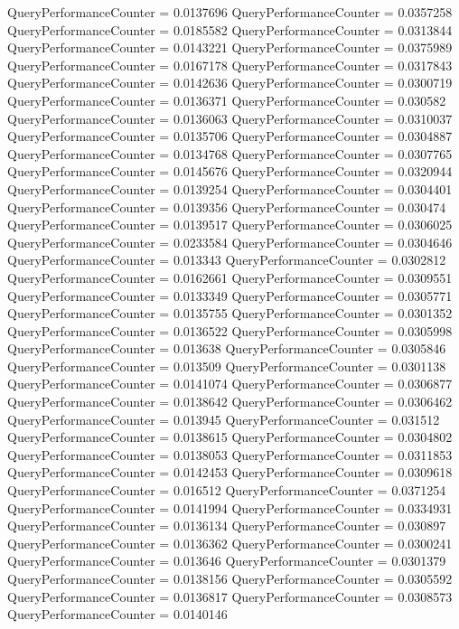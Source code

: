 \documentclass[9pt]{article}
\theoremstyle{plain}
\theoremstyle{definition}
\theoremstyle{remark}
\numberwithin{equation}{section}
\begin{document}
QueryPerformanceCounter  =  0.0137696
QueryPerformanceCounter  =  0.0357258
QueryPerformanceCounter  =  0.0185582
QueryPerformanceCounter  =  0.0313844
QueryPerformanceCounter  =  0.0143221
QueryPerformanceCounter  =  0.0375989
QueryPerformanceCounter  =  0.0167178
QueryPerformanceCounter  =  0.0317843
QueryPerformanceCounter  =  0.0142636
QueryPerformanceCounter  =  0.0300719
QueryPerformanceCounter  =  0.0136371
QueryPerformanceCounter  =  0.030582
QueryPerformanceCounter  =  0.0136063
QueryPerformanceCounter  =  0.0310037
QueryPerformanceCounter  =  0.0135706
QueryPerformanceCounter  =  0.0304887
QueryPerformanceCounter  =  0.0134768
QueryPerformanceCounter  =  0.0307765
QueryPerformanceCounter  =  0.0145676
QueryPerformanceCounter  =  0.0320944
QueryPerformanceCounter  =  0.0139254
QueryPerformanceCounter  =  0.0304401
QueryPerformanceCounter  =  0.0139356
QueryPerformanceCounter  =  0.030474
QueryPerformanceCounter  =  0.0139517
QueryPerformanceCounter  =  0.0306025
QueryPerformanceCounter  =  0.0233584
QueryPerformanceCounter  =  0.0304646
QueryPerformanceCounter  =  0.013343
QueryPerformanceCounter  =  0.0302812
QueryPerformanceCounter  =  0.0162661
QueryPerformanceCounter  =  0.0309551
QueryPerformanceCounter  =  0.0133349
QueryPerformanceCounter  =  0.0305771
QueryPerformanceCounter  =  0.0135755
QueryPerformanceCounter  =  0.0301352
QueryPerformanceCounter  =  0.0136522
QueryPerformanceCounter  =  0.0305998
QueryPerformanceCounter  =  0.013638
QueryPerformanceCounter  =  0.0305846
QueryPerformanceCounter  =  0.013509
QueryPerformanceCounter  =  0.0301138
QueryPerformanceCounter  =  0.0141074
QueryPerformanceCounter  =  0.0306877
QueryPerformanceCounter  =  0.0138642
QueryPerformanceCounter  =  0.0306462
QueryPerformanceCounter  =  0.013945
QueryPerformanceCounter  =  0.031512
QueryPerformanceCounter  =  0.0138615
QueryPerformanceCounter  =  0.0304802
QueryPerformanceCounter  =  0.0138053
QueryPerformanceCounter  =  0.0311853
QueryPerformanceCounter  =  0.0142453
QueryPerformanceCounter  =  0.0309618
QueryPerformanceCounter  =  0.016512
QueryPerformanceCounter  =  0.0371254
QueryPerformanceCounter  =  0.0141994
QueryPerformanceCounter  =  0.0334931
QueryPerformanceCounter  =  0.0136134
QueryPerformanceCounter  =  0.030897
QueryPerformanceCounter  =  0.0136362
QueryPerformanceCounter  =  0.0300241
QueryPerformanceCounter  =  0.013646
QueryPerformanceCounter  =  0.0301379
QueryPerformanceCounter  =  0.0138156
QueryPerformanceCounter  =  0.0305592
QueryPerformanceCounter  =  0.0136817
QueryPerformanceCounter  =  0.0308573
QueryPerformanceCounter  =  0.0140146
\end{document}
